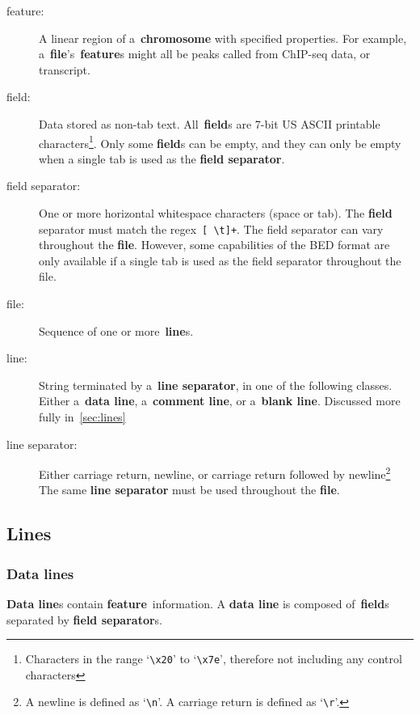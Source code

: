 \documentclass[11pt]{article}
\begin{document}
\begin{description}
\item[feature:]
  A linear region of a~\textbf{chromosome} with specified properties.
  For example, a~\textbf{file}'s~\textbf{feature}s might all be peaks called from ChIP-seq data, or transcript.

\item[field:]
  Data stored as non-tab text.
  All~\textbf{field}s are 7-bit US \ac{ASCII} printable characters\footnote{Characters in the range `\texttt{{\textbackslash}x20}' to `\texttt{{\textbackslash}x7e}', therefore not including any control characters}.
  Only some \textbf{field}s can be empty, and they can only be empty when a single tab is used as the \textbf{field separator}.

\item[field separator:]
  One or more horizontal whitespace characters (space or tab).
  The \textbf{field} separator must match the \ac{regex}~\texttt{[ {\textbackslash}t]+}.
  The field separator can vary throughout the \textbf{file}.
  However, some capabilities of the \ac{BED} format are only available if a single tab is used as the field separator throughout the file.

\item[file:]
  Sequence of one or more~\textbf{line}s.

\item[line:]
  String terminated by a~\textbf{line separator}, in one of the following classes.
  Either a~\textbf{data line}, a~\textbf{comment line}, or a~\textbf{blank line}.
  Discussed more fully in~\autoref{sec:lines}

\item[line separator:]
  Either carriage return, newline, or carriage return followed by newline\footnote{A newline is defined as `\texttt{{\textbackslash}n}'. A carriage return is defined as `\texttt{{\textbackslash}r}'.}
  The same \textbf{line separator} must be used throughout the \textbf{file}.
\end{description}

\subsection{Lines}\label{sec:lines}

\subsubsection{Data lines}

\textbf{Data line}s contain \textbf{feature}~information.
A \textbf{data line} is composed of~\textbf{field}s separated by \textbf{field separator}s.
\end{document}
